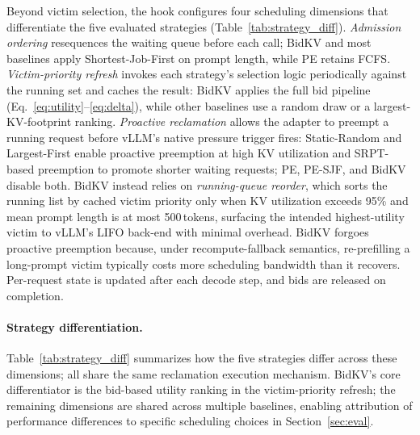 \documentclass[sigconf,nonacm]{acmart}
\newcommand{\bidkv}{BidKV\xspace}
\begin{document}
Beyond victim selection, the hook configures four scheduling dimensions
that differentiate the five evaluated strategies
(Table~\ref{tab:strategy_diff}).
\emph{Admission ordering} resequences the waiting queue before each call;
\bidkv and most baselines apply Shortest-Job-First on prompt length, while
PE retains FCFS.
\emph{Victim-priority refresh} invokes each strategy's selection logic
periodically against the running set and caches the result: \bidkv applies
the full bid pipeline (Eq.~\ref{eq:utility}--\ref{eq:delta}), while other
baselines use a random draw or a largest-KV-footprint ranking.
\emph{Proactive reclamation} allows the adapter to preempt a running request
before vLLM's native pressure trigger fires: Static-Random and Largest-First
enable proactive preemption at high KV utilization and SRPT-based preemption
to promote shorter waiting requests; PE, PE-SJF, and \bidkv disable both.
\bidkv instead relies on \emph{running-queue reorder}, which sorts the
running list by cached victim priority only when KV utilization exceeds 95\%
and mean prompt length is at most 500\,tokens, surfacing the intended
highest-utility victim to vLLM's LIFO back-end with minimal overhead.
BidKV forgoes proactive preemption because, under recompute-fallback
semantics, re-prefilling a long-prompt victim typically costs more scheduling
bandwidth than it recovers.
Per-request state is updated after each decode step, and bids are released
on completion.

\paragraph{Strategy differentiation.}
Table~\ref{tab:strategy_diff} summarizes how the five strategies differ
across these dimensions; all share the same reclamation execution mechanism.
\bidkv's core differentiator is the bid-based utility ranking in the
victim-priority refresh; the remaining dimensions are shared across multiple
baselines, enabling attribution of performance differences to specific
scheduling choices in Section~\ref{sec:eval}.
\end{document}

